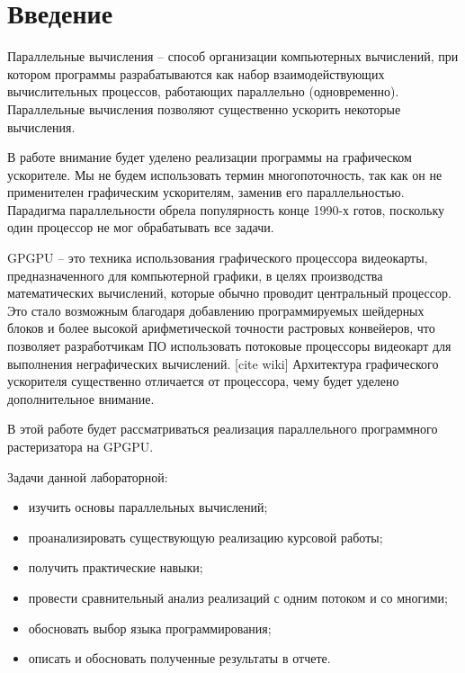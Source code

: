 \chapter*{\hfill{\centering Введение }\hfill}

Параллельные вычисления -- способ организации компьютерных вычислений, при котором программы разрабатываются как набор взаимодействующих вычислительных процессов, работающих параллельно (одновременно).
Параллельные вычисления позволяют существенно ускорить некоторые вычисления.

В работе внимание будет уделено реализации программы на графическом ускорителе.
Мы не будем использовать термин многопоточность, так как он не применителен графическим ускорителям, заменив его параллельностью.
Парадигма параллельности обрела популярность конце 1990-х готов, поскольку один процессор не мог обрабатывать все задачи.

GPGPU -- это техника использования графического процессора видеокарты, предназначенного для компьютерной графики, в целях производства математических вычислений, которые обычно проводит центральный процессор. Это стало возможным благодаря добавлению программируемых шейдерных блоков и более высокой арифметической точности растровых конвейеров, что позволяет разработчикам ПО использовать потоковые процессоры видеокарт для выполнения неграфических вычислений. [cite wiki]
Архитектура графического ускорителя существенно отличается от процессора, чему будет уделено дополнительное внимание.

В этой работе будет рассматриваться реализация параллельного программного растеризатора на GPGPU.

Задачи данной лабораторной:

\begin{itemize}
	\item изучить основы параллельных вычислений;
	\item проанализировать существующую реализацию курсовой работы;
	\item получить практические навыки;
	\item провести сравнительный анализ реализаций с одним потоком и со многими;
	\item обосновать выбор языка программирования;
	\item описать и обосновать полученные результаты в отчете.
\end{itemize}
